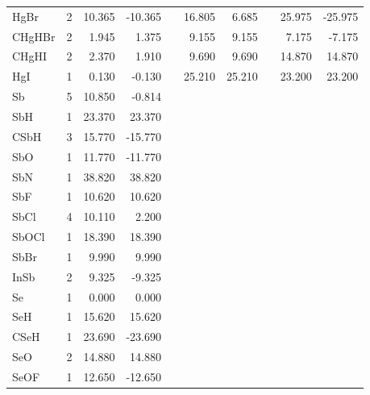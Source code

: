\begin{table}
\begin{center}
\begin{tabular}{lrrrrrrrrr}
      HgBr    &      2 &   10.365 &  -10.365 &  &   16.805 &    6.685 &  &   25.975 &  -25.975 \\
      CHgHBr  &      2 &    1.945 &    1.375 &  &    9.155 &    9.155 &  &    7.175 &   -7.175 \\
      CHgHI   &      2 &    2.370 &    1.910 &  &    9.690 &    9.690 &  &   14.870 &   14.870 \\
      HgI     &      1 &    0.130 &   -0.130 &  &   25.210 &   25.210 &  &   23.200 &   23.200 \\
  Sb        &   5 &   10.850 &   -0.814 &     &          &          &     &          &          \\
  SbH       &   1 &   23.370 &   23.370 &     &          &          &     &          &          \\
  CSbH      &   3 &   15.770 &  -15.770 &     &          &          &     &          &          \\
  SbO       &   1 &   11.770 &  -11.770 &     &          &          &     &          &          \\
  SbN       &   1 &   38.820 &   38.820 &     &          &          &     &          &          \\
  SbF       &   1 &   10.620 &   10.620 &     &          &          &     &          &          \\
  SbCl      &   4 &   10.110 &    2.200 &     &          &          &     &          &          \\
  SbOCl     &   1 &   18.390 &   18.390 &     &          &          &     &          &          \\
  SbBr      &   1 &    9.990 &    9.990 &     &          &          &     &          &          \\
  InSb      &   2 &    9.325 &   -9.325 &     &          &          &     &          &          \\
  Se        &   1 &    0.000 &    0.000 &     &          &          &     &          &          \\
  SeH       &   1 &   15.620 &   15.620 &     &          &          &     &          &          \\
  CSeH      &   1 &   23.690 &  -23.690 &     &          &          &     &          &          \\
  SeO       &   2 &   14.880 &   14.880 &     &          &          &     &          &          \\
  SeOF      &   1 &   12.650 &  -12.650 &     &          &          &     &          &          \\

\end{tabular}
\end{center}
\end{table}
